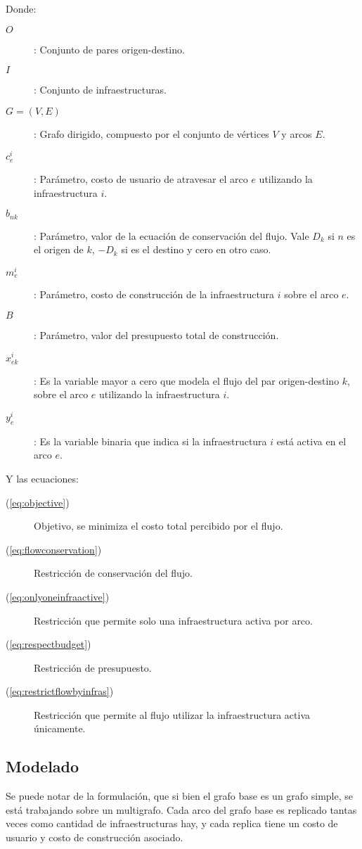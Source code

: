 \documentclass{article}
\begin{document}
  Donde:
  \begin{description}
    \item[$O$]: Conjunto de pares origen-destino.
    \item[$I$]: Conjunto de infraestructuras.
    \item[$G=(V, E)$]: Grafo dirigido, compuesto por el conjunto de vértices $V$ y arcos $E$.
    \item[$c_e^i$]: Parámetro, costo de usuario de atravesar el arco $e$ utilizando la infraestructura $i$.
    \item[$b_{nk}$]: Parámetro, valor de la ecuación de conservación del flujo. Vale $D_k$ si $n$ es el origen de $k$, $-D_k$ si es el destino y cero en otro caso.
    \item[$m_e^i$]: Parámetro, costo de construcción de la infraestructura $i$ sobre el arco $e$.
    \item[$B$]: Parámetro, valor del presupuesto total de construcción.
    \item[$x_{ek}^i$]: Es la variable mayor a cero que modela el flujo del par origen-destino $k$, sobre el arco $e$ utilizando la infraestructura $i$.
    \item[$y_e^i$]: Es la variable binaria que indica si la infraestructura $i$ está activa en el arco $e$.
  \end{description}

  Y las ecuaciones:

  \begin{description}
    \item[(\ref{eq:objective})] Objetivo, se minimiza el costo total percibido por el flujo.
    \item[(\ref{eq:flowconservation})] Restricción de conservación del flujo.
    \item[(\ref{eq:onlyoneinfraactive})] Restricción que permite solo una infraestructura activa por arco.
    \item[(\ref{eq:respectbudget})] Restricción de presupuesto.
    \item[(\ref{eq:restrictflowbyinfras})] Restricción que permite al flujo utilizar la infraestructura activa únicamente.
  \end{description}

  \subsection*{Modelado}

  Se puede notar de la formulación, que si bien el grafo base es un grafo simple, se está trabajando sobre un multigrafo. Cada arco del grafo base es replicado tantas veces como cantidad de infraestructuras hay, y cada replica tiene un costo de usuario y costo de construcción asociado.
\end{document}
